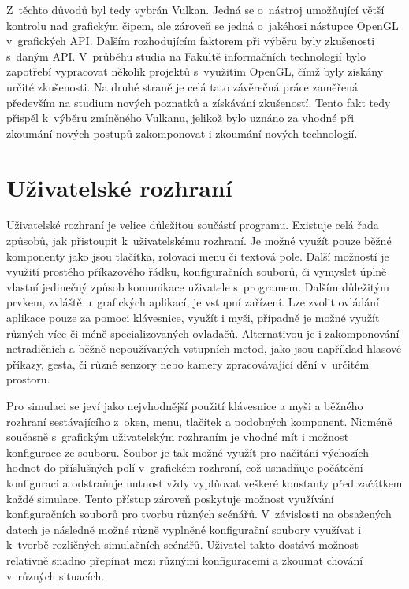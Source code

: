Z~těchto důvodů byl tedy vybrán Vulkan. Jedná se o~nástroj umožňující větší kontrolu nad grafickým čipem, ale zároveň se jedná o~jakéhosi nástupce OpenGL v~grafických API. Dalším rozhodujícím faktorem při výběru byly zkušenosti s~daným API. V~průběhu studia na Fakultě informačních technologií bylo zapotřebí vypracovat několik projektů s~využitím OpenGL, čímž byly získány určité zkušenosti. Na druhé straně je celá tato závěrečná práce zaměřená především na studium nových poznatků a získávání zkušeností. Tento fakt tedy přispěl k~výběru zmíněného Vulkanu, jelikož bylo uznáno za vhodné při zkoumání nových postupů zakomponovat i zkoumání nových technologií.

\section{Uživatelské rozhraní}
Uživatelské rozhraní je velice důležitou součástí programu. Existuje celá řada způsobů, jak přistoupit k~uživatelskému rozhraní. Je možné využít pouze běžné komponenty jako jsou tlačítka, rolovací menu či textová pole. Další možností je využití prostého příkazového řádku, konfiguračních souborů, či vymyslet úplně vlastní jedinečný způsob komunikace uživatele s~programem. Dalším důležitým prvkem, zvláště u~grafických aplikací, je vstupní zařízení. Lze zvolit ovládání aplikace pouze za pomoci klávesnice, využít i myši, případně je možné využít různých více či méně specializovaných ovladačů. Alternativou je i zakomponování netradičních a běžně nepoužívaných vstupních metod, jako jsou například hlasové příkazy, gesta, či různé senzory nebo kamery zpracovávající dění v~určitém prostoru.

Pro simulaci se jeví jako nejvhodnější použití klávesnice a myši a běžného rozhraní sestávajícího z~oken, menu, tlačítek a podobných komponent. Nicméně současně s~grafickým uživatelským rozhraním je vhodné mít i možnost konfigurace ze souboru. Soubor je tak možné využít pro načítání výchozích hodnot do příslušných polí v~grafickém rozhraní, což usnadňuje počáteční konfiguraci a odstraňuje nutnost vždy vyplňovat veškeré konstanty před začátkem každé simulace. Tento přístup zároveň poskytuje možnost využívání konfiguračních souborů pro tvorbu různých scénářů. V~závislosti na obsažených datech je následně možné různě vyplněné konfigurační soubory využívat i k~tvorbě rozličných simulačních scénářů. Uživatel takto dostává možnost relativně snadno přepínat mezi různými konfiguracemi a zkoumat chování v~různých situacích.

